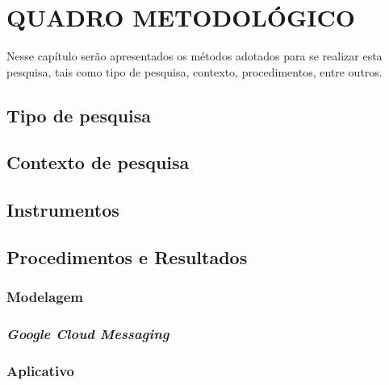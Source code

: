 \chapter{QUADRO METODOLÓGICO}

	\par Nesse capítulo serão apresentados os métodos adotados para se realizar esta
pesquisa, tais como tipo de pesquisa, contexto, procedimentos, entre outros.
	
	\section{Tipo de pesquisa}
		
	
	\section{Contexto de pesquisa}
		
	
	\section{Instrumentos}
		
	
	\section{Procedimentos e Resultados}
		
	
			\subsection{Modelagem}
				
	
			\subsection{\textit{Google Cloud Messaging}}
				
	
			\subsection{Aplicativo}
				
	
